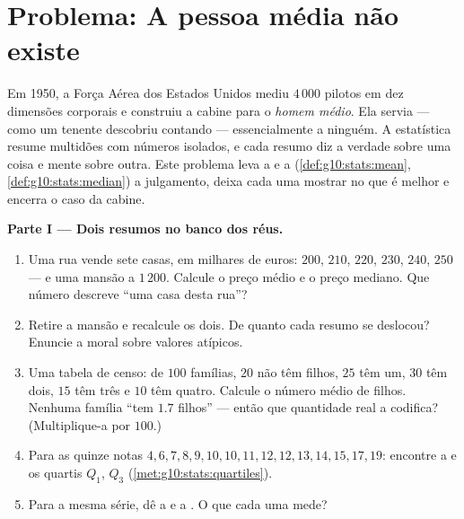 \section{Problema: A pessoa média não existe}

\begin{problem}
\label{pb:g10:stats:1}
Em 1950, a Força Aérea dos Estados Unidos mediu $4\,000$ pilotos em
dez dimensões corporais e construiu a cabine para o \emph{homem
médio}. Ela servia --- como um tenente descobriu contando ---
essencialmente a ninguém. A estatística resume multidões com
números isolados, e cada resumo diz a verdade sobre uma coisa e
mente sobre outra. Este problema leva a  e a 
(\cref{def:g10:stats:mean}, \cref{def:g10:stats:median}) a
julgamento, deixa cada uma mostrar no que é melhor e encerra o
caso da cabine.

\medskip
\noindent\textbf{Parte I --- Dois resumos no banco dos réus.}
\begin{enumerate}
  \item Uma rua vende sete casas, em milhares de euros: $200$,
        $210$, $220$, $230$, $240$, $250$ --- e uma mansão a
        $1\,200$. Calcule o preço médio e o preço mediano. Que
        número descreve ``uma casa desta rua''?
  \item Retire a mansão e recalcule os dois. De quanto cada
        resumo se deslocou? Enuncie a moral sobre valores
        atípicos.
  \item Uma tabela de censo: de $100$ famílias, $20$ não têm
        filhos, $25$ têm um, $30$ têm dois, $15$ têm três e $10$
        têm quatro. Calcule o número médio de filhos. Nenhuma
        família ``tem $1.7$ filhos'' --- então que quantidade real
        a  codifica? (Multiplique-a por $100$.)
  \item Para as quinze notas
        $4, 6, 7, 8, 9, 10, 10, 11, 12, 12, 13, 14, 15, 17, 19$:
        encontre a  e os quartis $Q_1$, $Q_3$
        (\cref{met:g10:stats:quartiles}).
  \item Para a mesma série, dê a  e a . O que cada uma mede?
\end{enumerate}


\end{problem}
